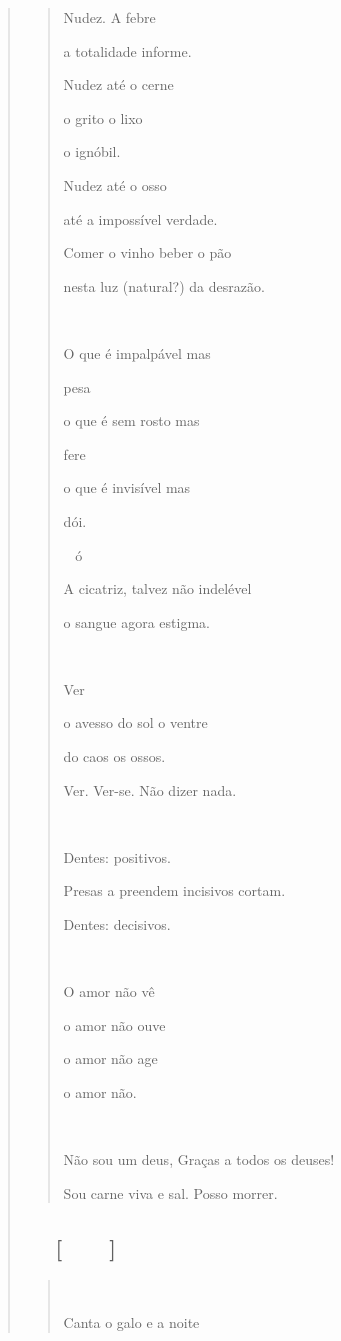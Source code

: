 \begin{verse}
\begin{quote}
Nudez. A febre

a totalidade informe.

Nudez até o cerne

o grito o lixo

o ignóbil.

Nudez até o osso

até a impossível verdade.

Comer o vinho beber o pão

nesta luz (natural?) da desrazão.



O que é impalpável mas

pesa

o que é sem rosto mas

fere

o que é invisível mas

dói.

ó

A cicatriz, talvez não indelével

o sangue agora estigma.



Ver

o avesso do sol o ventre

do caos os ossos.

Ver. Ver-se. Não dizer nada.

 

Dentes: positivos.

Presas a preendem incisivos cortam.

Dentes: decisivos.

 

O amor não vê

o amor não ouve

o amor não age

o amor não.



Não sou um deus, Graças a todos os deuses!

Sou carne viva e sal. Posso morrer.
\end{quote}

\subsection{ {[}{]}}\label{section-12}

\begin{quote}


Canta o galo e a noite


\end{quote}
\end{verse}
